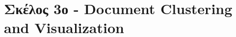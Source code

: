 \documentclass[12pt]{article}
\begin{document}
\section*{Σκέλος 3ο - Document Clustering and Visualization }
				

%	
\end{document}
